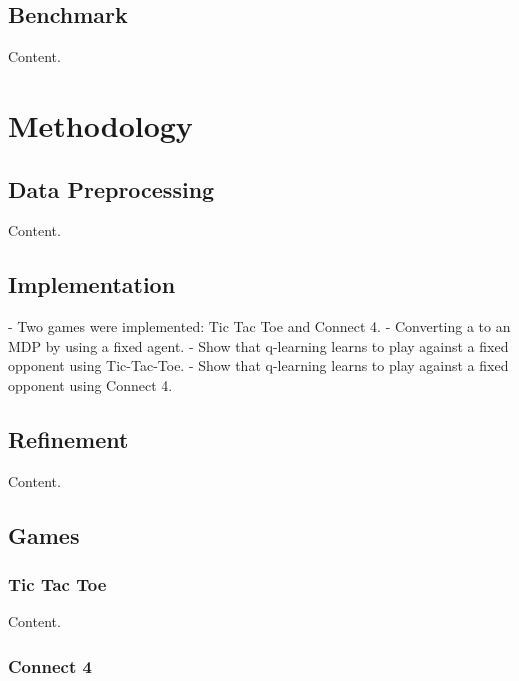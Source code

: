 \documentclass{article}
\begin{document}
\subsection{Benchmark}

Content.

\section{Methodology}

\subsection{Data Preprocessing}

Content.

\subsection{Implementation}

- Two games were implemented: Tic Tac Toe and Connect 4.
- Converting a to an MDP by using a fixed agent.
- Show that q-learning learns to play against a fixed opponent using Tic-Tac-Toe.
- Show that q-learning learns to play against a fixed opponent using Connect 4.

\subsection{Refinement}

Content.

\subsection{Games}

\subsubsection{Tic Tac Toe}

Content.

\subsubsection{Connect 4}
\end{document}
